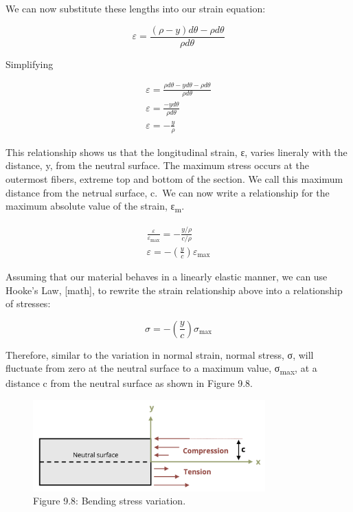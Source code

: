 \documentclass[
  letterpaper,
  DIV=11,
  numbers=noendperiod]{scrreprt}
\begin{document}
We can now substitute these lengths into our strain equation:

\[
\varepsilon=\frac{(\rho-y) d \theta-\rho d \theta}{\rho d \theta}
\]

Simplifying

\[
\begin{gathered}
\varepsilon=\frac{\rho d \theta-y d \theta-\rho d \theta}{\rho d \theta} \\
\varepsilon=\frac{-y d \theta}{\rho d \theta} \\
\varepsilon=-\frac{y}{\rho}
\end{gathered}
\]

This relationship shows us that the longitudinal strain, ε, varies
lineraly with the distance, y, from the neutral surface. The maximum
stress occurs at the outermost fibers, extreme top and bottom of the
section. We call this maximum distance from the netrual surface, c.~We
can now write a relationship for the maximum absolute value of the
strain, ε\textsubscript{m}.

\[
\begin{gathered}
\frac{\varepsilon}{\varepsilon_{\max }}=-\frac{y / \rho}{c / \rho} \\
\varepsilon=-\left(\frac{y}{c}\right) \varepsilon_{\max }
\end{gathered}
\]

Assuming that our material behaves in a linearly elastic manner, we can
use Hooke's Law, {[}math{]}, to rewrite the strain relationship above
into a relationship of stresses:

\[
\sigma=-\left(\frac{y}{c}\right) \sigma_{\max }
\]

Therefore, similar to the variation in normal strain, normal stress, σ,
will fluctuate from zero at the neutral surface to a maximum value,
σ\textsubscript{max}, at a distance c from the neutral surface as shown
in Figure 9.8.

\begin{figure}[H]

{\centering \includegraphics[width=3.52083in,height=\textheight]{images/CH9 PNGs/Figure 9.8.png}

}

\caption{Figure 9.8: Bending stress variation.}

\end{figure}%
\end{document}
